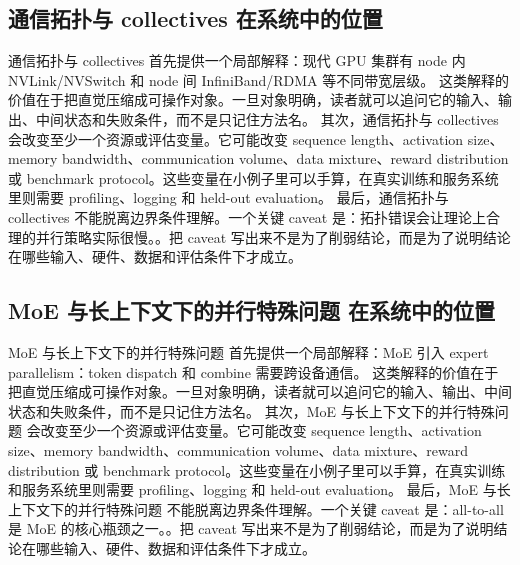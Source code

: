 \documentclass[a4paper]{article}
\begin{document}
\subsection{通信拓扑与 collectives 在系统中的位置}
通信拓扑与 collectives 首先提供一个局部解释：现代 GPU 集群有 node 内 NVLink/NVSwitch 和 node 间 InfiniBand/RDMA 等不同带宽层级。 这类解释的价值在于把直觉压缩成可操作对象。一旦对象明确，读者就可以追问它的输入、输出、中间状态和失败条件，而不是只记住方法名。
其次，通信拓扑与 collectives 会改变至少一个资源或评估变量。它可能改变 sequence length、activation size、memory bandwidth、communication volume、data mixture、reward distribution 或 benchmark protocol。这些变量在小例子里可以手算，在真实训练和服务系统里则需要 profiling、logging 和 held-out evaluation。
最后，通信拓扑与 collectives 不能脱离边界条件理解。一个关键 caveat 是：拓扑错误会让理论上合理的并行策略实际很慢。。把 caveat 写出来不是为了削弱结论，而是为了说明结论在哪些输入、硬件、数据和评估条件下才成立。
\subsection{MoE 与长上下文下的并行特殊问题 在系统中的位置}
MoE 与长上下文下的并行特殊问题 首先提供一个局部解释：MoE 引入 expert parallelism：token dispatch 和 combine 需要跨设备通信。 这类解释的价值在于把直觉压缩成可操作对象。一旦对象明确，读者就可以追问它的输入、输出、中间状态和失败条件，而不是只记住方法名。
其次，MoE 与长上下文下的并行特殊问题 会改变至少一个资源或评估变量。它可能改变 sequence length、activation size、memory bandwidth、communication volume、data mixture、reward distribution 或 benchmark protocol。这些变量在小例子里可以手算，在真实训练和服务系统里则需要 profiling、logging 和 held-out evaluation。
最后，MoE 与长上下文下的并行特殊问题 不能脱离边界条件理解。一个关键 caveat 是：all-to-all 是 MoE 的核心瓶颈之一。。把 caveat 写出来不是为了削弱结论，而是为了说明结论在哪些输入、硬件、数据和评估条件下才成立。
\end{document}
